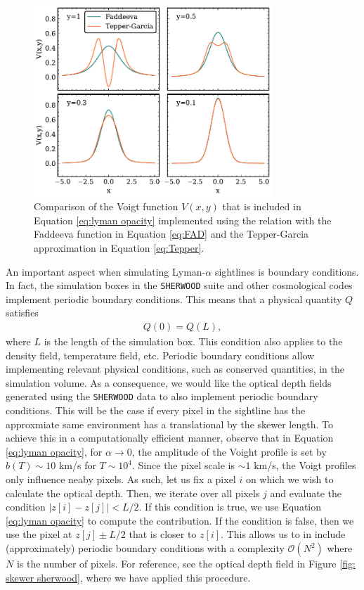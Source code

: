 \begin{figure}[ht]
        \centering
        \includegraphics[width=0.8\textwidth]{img/ML/TP-FA.pdf}
        \caption{Comparison of the Voigt function $V(x,y)$ that is included in Equation \ref{eq:lyman opacity} implemented using the relation with the Faddeeva function in Equation \ref{eq:FAD} and the Tepper-Garcia approximation in Equation \ref{eq:Tepper}.}
        \label{fig: VOIGT APPROX}     
\end{figure}

An important aspect when simulating Lyman-$\alpha$ sightlines is boundary conditions. In fact, the simulation boxes in the \texttt{SHERWOOD} suite and other cosmological codes implement periodic boundary conditions. This means that a physical quantity $Q$ satisfies
\begin{eqnarray}
        Q(0)=Q(L),
\end{eqnarray}
where $L$ is the length of the simulation box. This condition also applies to the density field, temperature field, etc. Periodic boundary conditions allow implementing relevant physical conditions, such as conserved quantities, in the simulation volume. As a consequence, we would like the optical depth fields generated using the \texttt{SHERWOOD} data to also implement periodic boundary conditions. This will be the case if every pixel in the sightline has the approxmiate same environment has a translational by the skewer length. To achieve this in a computationally efficient manner, observe that in Equation \ref{eq:lyman opacity}, for $\alpha\to 0$, the amplitude of the Voight profile is set by $b(T)\sim 10$ km/s for $T\sim 10^4$. Since the pixel scale is $\sim 1$ km/s, the Voigt profiles only influence neaby pixels. As such, let us fix a pixel $i$ on which we wish to calculate the optical depth. Then, we iterate over all pixels $j$ and evaluate the condition $|z[i]-z[j]| < L/2$. If this condition is true, we use Equation \ref{eq:lyman opacity} to compute the contribution. If the condition is false, then we use the pixel at $z[j]\pm L/2$ that is closer to $z[i]$. This allows us to in include (approximately) periodic boundary conditions with a complexity $\mathcal{O}(N^2)$ where $N$ is the number of pixels. For reference, see the optical depth field in Figure \ref{fig: skewer sherwood}, where we have applied this procedure.



